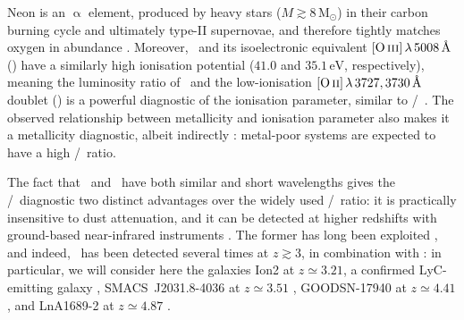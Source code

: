 Neon is an $\upalpha$ element, produced by heavy stars ($M \gtrsim 8 \, \mathrm{M_\odot}$) in their carbon burning cycle and ultimately type-II supernovae, and therefore tightly matches oxygen in abundance . Moreover, \NeIII\ and its isoelectronic equivalent $\OIIIf \, \lambda \, 5008 \, \Angstrom$ (\OIIIf) have a similarly high ionisation potential ($41.0$ and $35.1 \, \mathrm{eV}$, respectively), meaning the luminosity ratio of \NeIII\ and the low-ionisation $\OII \, \lambda \, 3727, 3730 \, \Angstrom$ doublet (\OII) is a powerful diagnostic of the ionisation parameter, similar to \OIIIf/\OII\ \citep[][; ]{2007MNRAS.381..125P, 2014ApJ...780..100L}. The observed relationship between metallicity and ionisation parameter also makes it a metallicity diagnostic, albeit indirectly \citep[causing it to exhibit a significant amount of scatter; see][]{2006A&A...459...85N, 2008A&A...488..463M}: metal-poor systems are expected to have a high \NeIII/\OII\ ratio.

The fact that \NeIII\ and \OII\ have both similar and short wavelengths gives the \NeIII/\OII\ diagnostic two distinct advantages over the widely used \OIIIf/\OII\ ratio: it is practically insensitive to dust attenuation, and it can be detected at higher redshifts with ground-based near-infrared instruments \citep{2014ApJ...780..100L}. The former has long been exploited \citep[e.g.][]{2002ApJ...581..205H}, and indeed, \NeIII\ has been detected several times at $z \gtrsim 3$, in combination with \OII: in particular, we will consider here the galaxies Ion2 at $z \simeq 3.21$, a confirmed LyC-emitting galaxy \citep[as discussed in \cref{chAssec:Discussion: CIV};][]{2016A&A...585A..51D, 2016ApJ...825...41V, 2020MNRAS.491.1093V}, SMACS~J2031.8-4036 at $z \simeq 3.51$ \citep{2012MNRAS.427.1953C, 2012MNRAS.427.1973C, 2016MNRAS.456.4191P}, GOODSN-17940 at $z \simeq 4.41$ \citep{2017ApJ...846L..30S}, and LnA1689-2 at $z \simeq 4.87$ \citep{2014A&A...563A..58T}.


